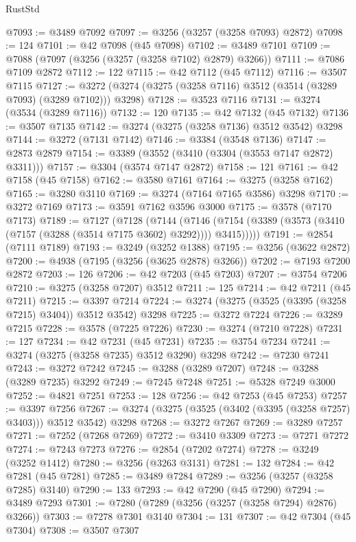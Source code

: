 \begin{lexlean}{RustStd}
\begin{coremodule}
@7093 := @3489 @7092
@7097 := @3256 (@3257 (@3258 @7093) @2872)
@7098 := 124
@7101 := @42 @7098 (@45 @7098)
@7102 := @3489 @7101
@7109 := @7088 (@7097 (@3256 (@3257 (@3258 @7102) @2879) @3266))
@7111 := @7086 @7109 @2872
@7112 := 122
@7115 := @42 @7112 (@45 @7112)
@7116 := @3507 @7115
@7127 := @3272 (@3274 (@3275 (@3258 @7116) @3512 (@3514 (@3289 @7093) (@3289 @7102))) @3298)
@7128 := @3523 @7116
@7131 := @3274 (@3534 (@3289 @7116))
@7132 := 120
@7135 := @42 @7132 (@45 @7132)
@7136 := @3507 @7135
@7142 := @3274 (@3275 (@3258 @7136) @3512 @3542) @3298
@7144 := @3272 (@7131 @7142)
@7146 := @3384 (@3548 @7136)
@7147 := @2873 @2879
@7154 := @3389 (@3552 (@3410 (@3304 (@3553 @7147 @2872) @3311)))
@7157 := @3304 (@3574 @7147 @2872)
@7158 := 121
@7161 := @42 @7158 (@45 @7158)
@7162 := @3580 @7161
@7164 := @3275 (@3258 @7162)
@7165 := @3280 @3110
@7169 := @3274 (@7164 @7165 @3586) @3298
@7170 := @3272 @7169
@7173 := @3591 @7162 @3596 @3000
@7175 := @3578 (@7170 @7173)
@7189 := @7127
    (@7128
      (@7144
        (@7146 (@7154 (@3389 (@3573 (@3410 (@7157 (@3288 (@3514 @7175 @3602) @3292)))) @3415)))))
@7191 := @2854 (@7111 @7189)
@7193 := @3249 (@3252 @1388)
@7195 := @3256 (@3622 @2872)
@7200 := @4938 (@7195 (@3256 (@3625 @2878) @3266))
@7202 := @7193 @7200 @2872
@7203 := 126
@7206 := @42 @7203 (@45 @7203)
@7207 := @3754 @7206
@7210 := @3275 (@3258 @7207) @3512
@7211 := 125
@7214 := @42 @7211 (@45 @7211)
@7215 := @3397 @7214
@7224 := @3274 (@3275 (@3525 (@3395 (@3258 @7215) @3404)) @3512 @3542) @3298
@7225 := @3272 @7224
@7226 := @3289 @7215
@7228 := @3578 (@7225 @7226)
@7230 := @3274 (@7210 @7228)
@7231 := 127
@7234 := @42 @7231 (@45 @7231)
@7235 := @3754 @7234
@7241 := @3274 (@3275 (@3258 @7235) @3512 @3290) @3298
@7242 := @7230 @7241
@7243 := @3272 @7242
@7245 := @3288 (@3289 @7207)
@7248 := @3288 (@3289 @7235) @3292
@7249 := @7245 @7248
@7251 := @5328 @7249 @3000
@7252 := @4821 @7251
@7253 := 128
@7256 := @42 @7253 (@45 @7253)
@7257 := @3397 @7256
@7267 := @3274 (@3275 (@3525 (@3402 (@3395 (@3258 @7257) @3403))) @3512 @3542) @3298
@7268 := @3272 @7267
@7269 := @3289 @7257
@7271 := @7252 (@7268 @7269)
@7272 := @3410 @3309
@7273 := @7271 @7272
@7274 := @7243 @7273
@7276 := @2854 (@7202 @7274)
@7278 := @3249 (@3252 @1412)
@7280 := @3256 (@3263 @3131)
@7281 := 132
@7284 := @42 @7281 (@45 @7281)
@7285 := @3489 @7284
@7289 := @3256 (@3257 (@3258 @7285) @3140)
@7290 := 133
@7293 := @42 @7290 (@45 @7290)
@7294 := @3489 @7293
@7301 := @7280 (@7289 (@3256 (@3257 (@3258 @7294) @2876) @3266))
@7303 := @7278 @7301 @3140
@7304 := 131
@7307 := @42 @7304 (@45 @7304)
@7308 := @3507 @7307

\end{coremodule}
\end{lexlean}
